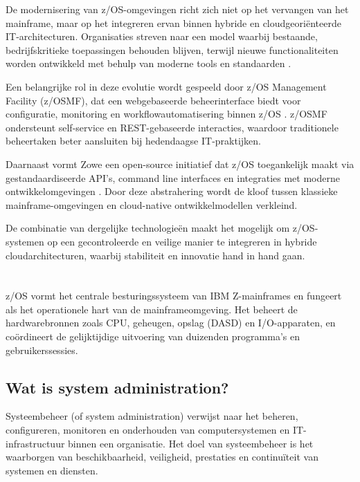 De modernisering van z/OS-omgevingen richt zich niet op het vervangen van het mainframe, maar op het integreren ervan binnen hybride en cloudgeoriënteerde IT-architecturen. Organisaties streven naar een model waarbij bestaande, bedrijfskritieke toepassingen behouden blijven, terwijl nieuwe functionaliteiten worden ontwikkeld met behulp van moderne tools en standaarden \autocite{ibm2023hybrid}.

Een belangrijke rol in deze evolutie wordt gespeeld door z/OS Management Facility (z/OSMF), dat een webgebaseerde beheerinterface biedt voor configuratie, monitoring en workflowautomatisering binnen z/OS \autocite{ibm2023zosmf}. z/OSMF ondersteunt self-service en REST-gebaseerde interacties, waardoor traditionele beheertaken beter aansluiten bij hedendaagse IT-praktijken.

Daarnaast vormt Zowe een open-source initiatief dat z/OS toegankelijk maakt via gestandaardiseerde API’s, command line interfaces en integraties met moderne ontwikkelomgevingen \autocite{zowe2023}. Door deze abstrahering wordt de kloof tussen klassieke mainframe-omgevingen en cloud-native ontwikkelmodellen verkleind.

De combinatie van dergelijke technologieën maakt het mogelijk om z/OS-systemen op een gecontroleerde en veilige manier te integreren in hybride cloudarchitecturen, waarbij stabiliteit en innovatie hand in hand gaan.


\section{}
\label{sec:role-van-zos-in-mainframes}
z/OS vormt het centrale besturingssysteem van IBM Z-mainframes en fungeert als het operationele hart van de mainframeomgeving. Het beheert de hardwarebronnen zoals CPU, geheugen, opslag (DASD) en I/O-apparaten, en coördineert de gelijktijdige uitvoering van duizenden programma’s en gebruikerssessies.\autocite{IBM_zOS_Concepts}

\subsection{Wat is system administration?}
\label{sec:wat-is-systembeheer}

Systeembeheer (of system administration) verwijst naar het beheren, configureren, monitoren en onderhouden van computersystemen en IT-infrastructuur binnen een organisatie. Het doel van systeembeheer is het waarborgen van beschikbaarheid, veiligheid, prestaties en continuïteit van systemen en diensten. \autocite{TechNeeds2025}

